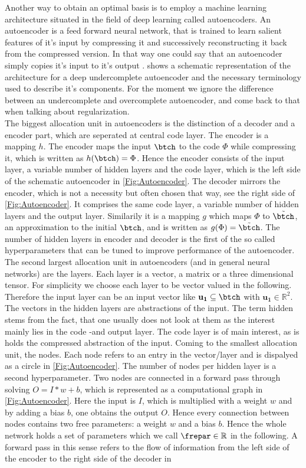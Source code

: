 Another way to obtain an optimal basis is to employ a machine learning architecture situated in the field of deep learning called autoencoders. An autoencoder is a feed forward neural network, that is trained to learn salient features of it's input by compressing it and successively reconstructing it back from the compressed version. In that way one could say that an autoencoder simply copies it's input to it's output \cite{Goodfellow}.  shows a schematic representation of the architecture for a deep undercomplete autoencoder and the necessary terminology used to describe it's components. For the moment we ignore the difference between an undercomplete and overcomplete autoencoder, and come back to that when talking about regularization. \\
The biggest allocation unit in autoencoders is the distinction of a decoder and a encoder part, which are seperated at central code layer. The encoder is a mapping \(h\). The encoder maps the input \(\btch\) to the code \(\Phi\) while compressing it, which is written as \(h(\btch)=\Phi\). Hence the encoder consists of the input layer, a variable number of hidden layers and the code layer, which is the left side of the schematic autoencoder in \cref{Fig:Autoencoder}. The decoder mirrors the encoder, which is not a necessity but often chosen that way, see the right side of \cref{Fig:Autoencoder}. It comprises the same code layer, a variable number of hidden layers and the output layer. Similarily it is a mapping \(g\) which maps \(\Phi\) to \(\tilde{\btch}\), an approximation to the initial \(\btch\), and is written as \(g(\Phi)=\tilde{\btch}\). The number of hidden layers in encoder and decoder is the first of the so called hyperparameters that can be tuned to improve performance of the autoencoder. The second largest allocation unit in autoencoders (and in general neural networks) are the layers. Each layer is a vector, a matrix or a three dimensional tensor. For simplicity we choose each layer to be vector valued in the following. Therefore the input layer can be an input vector like \(\mathbf{u_1}\subseteq \btch\) with \(\mathbf{u_1} \in \mathbb{R}^2\). The vectors in the hidden layers are abstractions of the input. The term hidden stems from the fact, that one usually does not look at them as the interest mainly lies in the code -and output layer. The code layer is of main interest, as is holds the compressed abstraction of the input. Coming to the smallest allocation unit, the nodes. Each node refers to an entry in the vector/layer and is dispalyed as a circle in \cref{Fig:Autoencoder}. The number of nodes per hidden layer is a second hyperparameter. Two nodes are connected in a forward pass through solving \(O=I*w+b\), which is represented as a computational graph in \cref{Fig:Autoencoder}. Here the input is \(I\), which is multiplied with a weight \(w\) and by adding a bias \(b\), one obtains the output \(O\). Hence every connection between nodes contains two free parameters: a weight \(w\) and a bias \(b\). Hence the whole network holds a set of parameters which we call \(\frepar \in \mathbb{R}\) in the following. A forward pass in this sense refers to the flow of information from the left side of the encoder to the right side of the decoder in 